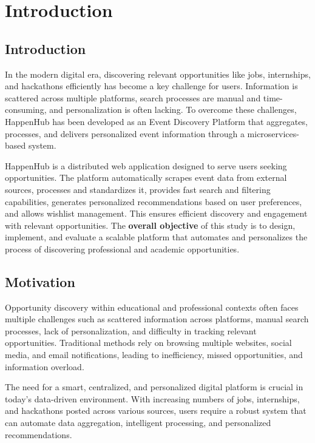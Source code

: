 \documentclass[12pt, a4paper]{report}
\begin{document}
\setcounter{page}{1} %
\pagestyle{main} %

\chapter{Introduction}
\section{Introduction} %
In the modern digital era, discovering relevant opportunities like jobs, internships, and hackathons efficiently has become a key challenge for users. Information is scattered across multiple platforms, search processes are manual and time-consuming, and personalization is often lacking. To overcome these challenges, HappenHub has been developed as an Event Discovery Platform that aggregates, processes, and delivers personalized event information through a microservices-based system.

HappenHub is a distributed web application designed to serve users seeking opportunities. The platform automatically scrapes event data from external sources, processes and standardizes it, provides fast search and filtering capabilities, generates personalized recommendations based on user preferences, and allows wishlist management. This ensures efficient discovery and engagement with relevant opportunities. The \textbf{overall objective} of this study is to design, implement, and evaluate a scalable platform that automates and personalizes the process of discovering professional and academic opportunities. %

\section{Motivation}
Opportunity discovery within educational and professional contexts often faces multiple challenges such as scattered information across platforms, manual search processes, lack of personalization, and difficulty in tracking relevant opportunities. Traditional methods rely on browsing multiple websites, social media, and email notifications, leading to inefficiency, missed opportunities, and information overload.

The need for a smart, centralized, and personalized digital platform is crucial in today's data-driven environment. With increasing numbers of jobs, internships, and hackathons posted across various sources, users require a robust system that can automate data aggregation, intelligent processing, and personalized recommendations.
\end{document}
